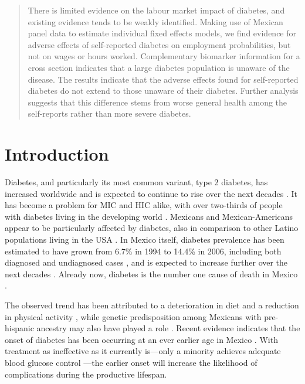 
\begin{abstract}
There is limited evidence on the labour market impact of diabetes, and existing evidence tends to be weakly identified. Making use of Mexican panel data to estimate individual fixed effects models, we find evidence for adverse effects of self-reported diabetes on employment probabilities, but not on wages or hours worked. Complementary biomarker information for a cross section indicates that a large diabetes population is unaware of the disease. The results indicate that the adverse effects found for self-reported diabetes do not extend to those unaware of their diabetes. Further analysis suggests that this difference stems from worse general health among the self-reports rather than more severe diabetes.
\end{abstract}



\section{\label{sec:Introduction4}Introduction }

Diabetes, and particularly its most common variant, type 2 diabetes, has increased worldwide and is expected to continue to rise over the next decades \parencite{Risk2016}. It has become a problem for \acf{MIC} and \acf{HIC} alike, with over two-thirds of people with diabetes living in the developing world \parencite{InternationalDiabetesFederation2013}. Mexicans and Mexican-Americans appear to be particularly affected by diabetes, also in comparison to other Latino populations living in the USA \parencite{Schneiderman2014}. In Mexico itself, diabetes prevalence has been estimated to have grown from 6.7\% in 1994 to 14.4\% in 2006, including both diagnosed and undiagnosed cases \parencite{Barquera2013}, and is expected to increase further over the next decades \parencite{Meza2015}. Already now, diabetes is the number one cause of death in Mexico \parencite{Barquera2013}. 

The observed trend has been attributed to a deterioration in diet and a reduction in physical activity \parencite{Barquera2008b,Basu2013}, while genetic predisposition among Mexicans with pre-hispanic ancestry may also have played a role \parencite{Williams2013}. Recent evidence indicates that the onset of diabetes has been occurring at an ever earlier age in Mexico \parencite{Villalpando2010}. With treatment as ineffective as it currently is---only a minority achieves adequate blood glucose control \parencite{Barquera2013}---the earlier onset will increase the likelihood of complications during the productive lifespan. 


